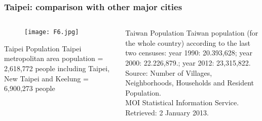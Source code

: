 \documentclass[pdflatex,compress,8pt,
	xcolor={dvipsnames,dvipsnames,svgnames,x11names,table},
	hyperref={colorlinks = true,breaklinks = true, urlcolor = NavyBlue, breaklinks = true}]{beamer}
\begin{document}
\begin{frame}\frametitle{Taipei: comparison with other major cities}
\begin{minipage}[0.4\textheight]{\textwidth}
\begin{columns}[T]
\begin{column}{0.5\textwidth}
\begin{figure}[H]
	\centering
		\texttt{[image: F6.jpg]}
\end{figure}

\begin{alertblock}{Taipei Population}
Taipei metropolitan area population = 2,618,772 people
 including Taipei, New Taipei and Keelung = 6,900,273 people
\end{alertblock}

\end{column}
\begin{column}{0.5\textwidth}
\vspace{10em}
\begin{block}{Taiwan Population}
Taiwan population (for the whole country) according to the last two censuses: year 1990: 20.393,628; year 2000: 22.226,879.; year 2012: 23,315,822.\\
Source: Number of Villages, Neighborhoods, Households and Resident Population. \\
MOI Statistical Information Service. Retrieved: 2 January 2013.
\end{block}

\end{column}
\end{columns}
\end{minipage}
\end{frame}
\end{document}
